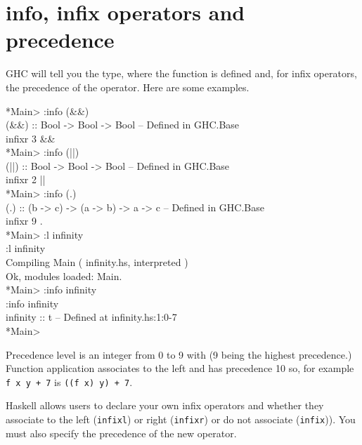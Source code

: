 \documentclass[11pt]{article}
\begin{document}

\section{}


\section{info, infix operators and precedence}

GHC will tell you the type, where the function is defined and, for infix
operators, the precedence of the operator.  Here are some examples.

\begin{program*}
\> *Main> :info (\&\&) \\
\> (\&\&) :: Bool -> Bool -> Bool    -- Defined in GHC.Base \\
\> infixr 3 \&\& \\
\> *Main> :info (||) \\
\> (||) :: Bool -> Bool -> Bool    -- Defined in GHC.Base \\
\> infixr 2 || \\
\> *Main> :info (.) \\
\> (.) :: (b -> c) -> (a -> b) -> a -> c   -- Defined in GHC.Base \\
\> infixr 9 . \\
\> *Main> :l infinity \\
\> :l infinity \\
\> [1 of 1] Compiling Main             ( infinity.hs, interpreted ) \\
\> Ok, modules loaded: Main. \\
\> *Main> :info infinity \\
\> :info infinity \\
\> infinity :: t   -- Defined at infinity.hs:1:0-7 \\
\> *Main>  \\
\end{program*}

Precedence level is an integer from 0 to 9 with (9 being the highest
precedence.)  Function application associates to the left and has precedence 10
so, for example {\tt{f x y + 7}} is {\tt{((f x) y) + 7}}.

Haskell allows users to declare your own infix operators and whether they
associate to the left ({\tt{infixl}}) or right ({\tt{infixr}}) or do not
associate ({\tt{infix}})).  You must also specify the precedence of the new
operator.
\end{document}
